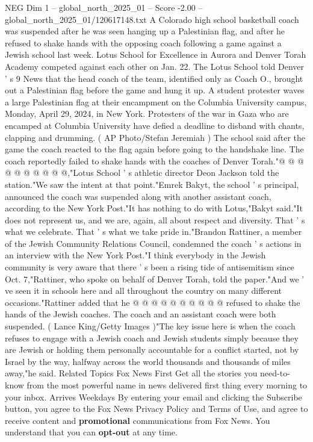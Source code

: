 \begin{textsample}{NEG Dim 1 – global\_north\_2025\_01 – Score -2.00 – global\_north\_2025\_01/120617148.txt}  \label{ex:f1_neg_082}
A Colorado high school basketball coach was suspended after he was seen hanging up a Palestinian flag, and after he refused to shake hands with the opposing coach following a game against a Jewish school last week.
Lotus School for Excellence in Aurora and Denver Torah Academy competed against each other on Jan. 22.
The Lotus School told Denver ' s 9 News that the head coach of the team, identified only as Coach O., brought out a Palestinian flag before the game and hung it up.
A student protester waves a large Palestinian flag at their encampment on the Columbia University campus, Monday, April 29, 2024, in New York.
Protesters of the war in Gaza who are encamped at Columbia University have defied a deadline to disband with chants, clapping and drumming. ( AP Photo/Stefan Jeremiah ) The school said after the game the coach reacted to the flag again before going to the handshake line.
The coach reportedly failed to shake hands with the coaches of Denver Torah."@ @ @ @ @ @ @ @ @ @,"Lotus School ' s athletic director Deon Jackson told the station."We saw the intent at that point."Emrek Bakyt, the school ' s principal, announced the coach was suspended along with another assistant coach, according to the New York Post."It has nothing to do with Lotus,"Bakyt said."It does not represent us, and we are, again, all about respect and diversity.
That ' s what we celebrate.
That ' s what we take pride in."Brandon Rattiner, a member of the Jewish Community Relations Council, condemned the coach ' s actions in an interview with the New York Post."I think everybody in the Jewish community is very aware that there ' s been a rising tide of antisemitism since Oct. 7,"Rattiner, who spoke on behalf of Denver Torah, told the paper."And we ' ve seen it in schools here and all throughout the country on many different occasions."Rattiner added that he @ @ @ @ @ @ @ @ @ @ refused to shake the hands of the Jewish coaches.
The coach and an assistant coach were both suspended. ( Lance King/Getty Images )"The key issue here is when the coach refuses to engage with a Jewish coach and Jewish students simply because they are Jewish or holding them personally accountable for a conflict started, not by Israel by the way, halfway across the world thousands and thousands of miles away,"he said.
Related Topics Fox News First Get all the stories you need-to-know from the most powerful name in news delivered first thing every morning to your inbox.
Arrives Weekdays By entering your email and clicking the Subscribe button, you agree to the Fox News Privacy Policy and Terms of Use, and agree to receive content and \textbf{promotional} communications from Fox News.
You understand that you can \textbf{opt-out} at any time.

\end{textsample}
